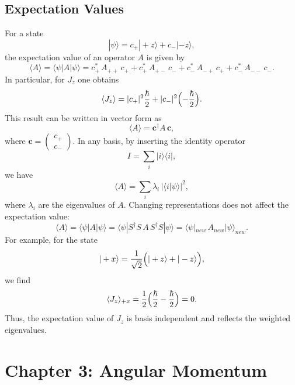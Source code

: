 \documentclass[twocolumn]{article}
\begin{document}
\begin{spacing}{1}
  \subsection{Expectation Values}
  For a state
  \[
  |\psi\rangle = c_{+}|+z\rangle + c_{-}|-z\rangle,
  \]
  the expectation value of an operator \(A\) is given by
  \[
  \langle A \rangle = \langle\psi|A|\psi\rangle = c_{+}^*\,A_{++}\,c_{+}+ c_{+}^*\,A_{+-}\,c_{-}+ c_{-}^*\,A_{-+}\,c_{+}+ c_{-}^*\,A_{--}\,c_{-}.
  \]
  In particular, for \(J_z\) one obtains
  \[
  \langle J_z\rangle = |c_{+}|^2\frac{\hbar}{2}+|c_{-}|^2\Bigl(-\frac{\hbar}{2}\Bigr).
  \]
  This result can be written in vector form as
  \[
  \langle A \rangle = \mathbf{c}^{\dagger} A\,\mathbf{c},
  \]
  where \(\mathbf{c}=\begin{pmatrix}c_{+}\\c_{-}\end{pmatrix}\).  
  In any basis, by inserting the identity operator
  \[
  I = \sum_{i}|i\rangle\langle i|,
  \]
  we have
  \[
  \langle A \rangle = \sum_{i}\lambda_i\,|\langle i|\psi\rangle|^2,
  \]
  where \(\lambda_i\) are the eigenvalues of \(A\).  
  Changing representations does not affect the expectation value:
  \[
  \langle A \rangle = \langle\psi|A|\psi\rangle = \langle\psi|S^{\dagger}S\,A\,S^{\dagger}S|\psi\rangle = \langle\psi|_{new}\,A_{new}|\psi\rangle_{new}.
  \]
  For example, for the state
  \[
  |+x\rangle = \frac{1}{\sqrt{2}}\Bigl(|+z\rangle+|-z\rangle\Bigr),
  \]
  we find
  \[
  \langle J_z\rangle_{+x} = \frac{1}{2}\Bigl(\frac{\hbar}{2} - \frac{\hbar}{2}\Bigr)=0.
  \]
  Thus, the expectation value of \(J_z\) is basis independent and reflects the weighted eigenvalues.
  
  \section{Chapter 3: Angular Momentum}


\end{spacing}
\end{document}
